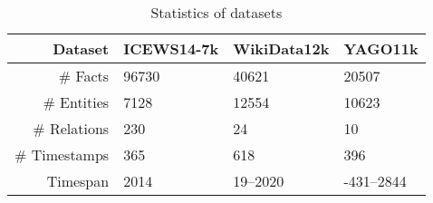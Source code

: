 \begin{table}[htb]
\centering
\begin{minipage}{\columnwidthcaption}
\centering
\caption{Statistics of datasets}
\end{minipage}

\vspace{-3mm}
\begin{tabular}{r|M{0.22}M{0.22}M{0.21}} \hline
Dataset & ICEWS14-7k & WikiData12k & YAGO11k \\
\hline
\# Facts & 96730 & 40621 & 20507\\
\# Entities & 7128 & 12554 & 10623\\
\# Relations & 230 & 24 & 10\\
\# Timestamps & 365 & 618 & 396 \\
Timespan & 2014 & 19--2020 &-431--2844\\
\hline
\end{tabular}
\label{tab:dataset_stats}
\end{table}